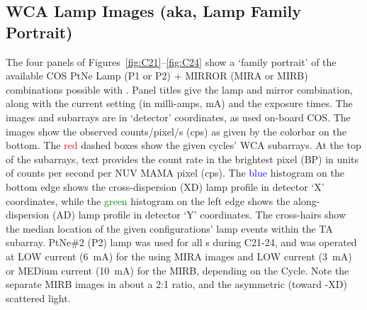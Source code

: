 \subsection{WCA Lamp Images (aka, Lamp Family Portrait) \label{subsec:fportrait} }
\normalsize
The four panels of Figures~\ref{fig:C21}--\ref{fig:C24} show a `family portrait' of the available COS PtNe Lamp (P1 or P2) + MIRROR (MIRA or MIRB)
combinations possible with .
Panel titles give the lamp and mirror combination, along with the current setting (in milli-amps, mA) and the exposure times.
The images and subarrays are in `detector' coordinates, as used on-board COS.
The images show the observed counts/pixel/s (cps) as given by the colorbar on the bottom.
The \textcolor{red}{red} dashed boxes show the given cycles'  WCA subarrays. At the top of the subarrays, text provides the count rate in the brightest pixel (BP) in units of counts per second per NUV MAMA pixel (cps).
The \textcolor{blue}{blue} histogram on the bottom edge shows the cross-dispersion (XD) lamp profile in detector `X' coordinates, while
the \textcolor{green}{green} histogram on the left edge shows the along-dispersion (AD) lamp profile in detector `Y' coordinates.
The cross-hairs show the median location of the given configurations' lamp events within the TA subarray.
PtNe\#2 (P2) lamp was used for all s during C21-24, and was operated at LOW current (6~mA) for the using MIRA images
and LOW current (3~mA) or MEDium current (10~mA) for the MIRB, depending on the Cycle. Note the separate MIRB images in about a 2:1 ratio, and the asymmetric
(toward -XD) scattered light.

